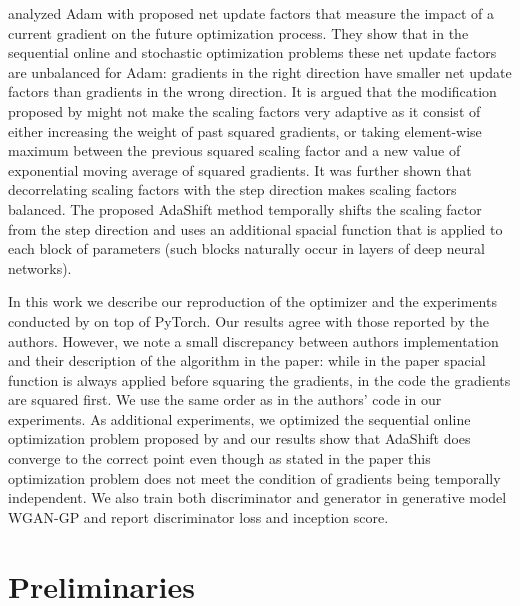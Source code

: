 \documentclass{article} %
\begin{document}
\cite{zhou2018adashift} analyzed Adam with proposed net update
factors that measure the impact of a current gradient on the
future optimization process. They show that in the sequential
online and stochastic optimization problems these net update
factors are unbalanced for Adam: gradients in the
right direction have smaller net update factors than
gradients in the wrong direction. It is
argued that the modification proposed by \cite{reddi2018on}
might not make the scaling factors very adaptive as it
consist of either increasing the weight of past squared gradients,
or taking element-wise maximum between the previous
squared scaling factor and a new value of exponential moving
average of squared gradients. It was further shown that
decorrelating scaling factors with the step direction
makes scaling factors balanced. The proposed AdaShift
method temporally shifts the scaling factor from the
step direction and uses an additional spacial function
that is applied to each block of parameters (such blocks
naturally occur in layers of deep neural networks).

In this work we describe our reproduction of the optimizer
and the experiments conducted by \cite{zhou2018adashift}
on top of PyTorch. Our results agree with those reported
by the authors. However, we
note a small discrepancy between authors implementation
and their description of the algorithm in the paper:
while in the paper spacial function is always applied before
squaring the gradients, in the code the gradients are
squared first. We use the same order as in the authors' code
in our experiments. As additional experiments,
we optimized the sequential online optimization problem
proposed by \cite{reddi2018on} and our results show
that AdaShift does converge to the correct point
even though as stated in the paper this optimization
problem does not meet the condition of gradients being temporally independent. We also train both discriminator
and generator in generative model WGAN-GP \citep{gulrajani2017improved} and report discriminator loss
and inception score.



\section{Preliminaries}\label{sec:preliminaries}
\end{document}
